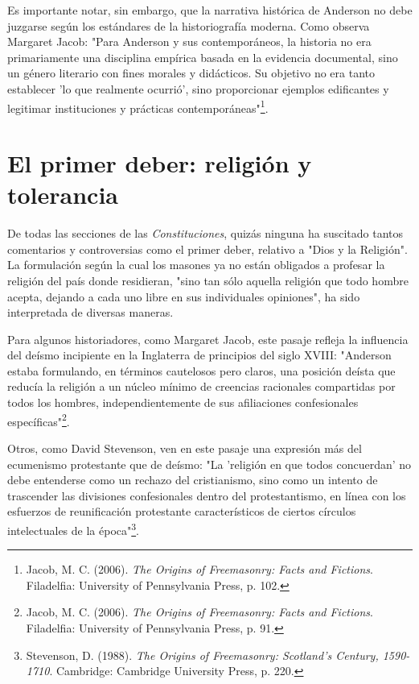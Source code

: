 \documentclass[a4paper,12pt,twoside]{book}
\begin{document}
Es importante notar, sin embargo, que la narrativa histórica de Anderson no debe juzgarse según los estándares de la historiografía moderna. Como observa Margaret Jacob: "Para Anderson y sus contemporáneos, la historia no era primariamente una disciplina empírica basada en la evidencia documental, sino un género literario con fines morales y didácticos. Su objetivo no era tanto establecer 'lo que realmente ocurrió', sino proporcionar ejemplos edificantes y legitimar instituciones y prácticas contemporáneas"\footnote{Jacob, M. C. (2006). \textit{The Origins of Freemasonry: Facts and Fictions}. Filadelfia: University of Pennsylvania Press, p. 102.}.

\section{El primer deber: religión y tolerancia}

De todas las secciones de las \textit{Constituciones}, quizás ninguna ha suscitado tantos comentarios y controversias como el primer deber, relativo a "Dios y la Religión". La formulación según la cual los masones ya no están obligados a profesar la religión del país donde residieran, "sino tan sólo aquella religión que todo hombre acepta, dejando a cada uno libre en sus individuales opiniones", ha sido interpretada de diversas maneras.

Para algunos historiadores, como Margaret Jacob, este pasaje refleja la influencia del deísmo incipiente en la Inglaterra de principios del siglo XVIII: "Anderson estaba formulando, en términos cautelosos pero claros, una posición deísta que reducía la religión a un núcleo mínimo de creencias racionales compartidas por todos los hombres, independientemente de sus afiliaciones confesionales específicas"\footnote{Jacob, M. C. (2006). \textit{The Origins of Freemasonry: Facts and Fictions}. Filadelfia: University of Pennsylvania Press, p. 91.}.

Otros, como David Stevenson, ven en este pasaje una expresión más del ecumenismo protestante que de deísmo: "La 'religión en que todos concuerdan' no debe entenderse como un rechazo del cristianismo, sino como un intento de trascender las divisiones confesionales dentro del protestantismo, en línea con los esfuerzos de reunificación protestante característicos de ciertos círculos intelectuales de la época"\footnote{Stevenson, D. (1988). \textit{The Origins of Freemasonry: Scotland's Century, 1590-1710}. Cambridge: Cambridge University Press, p. 220.}.
\end{document}
